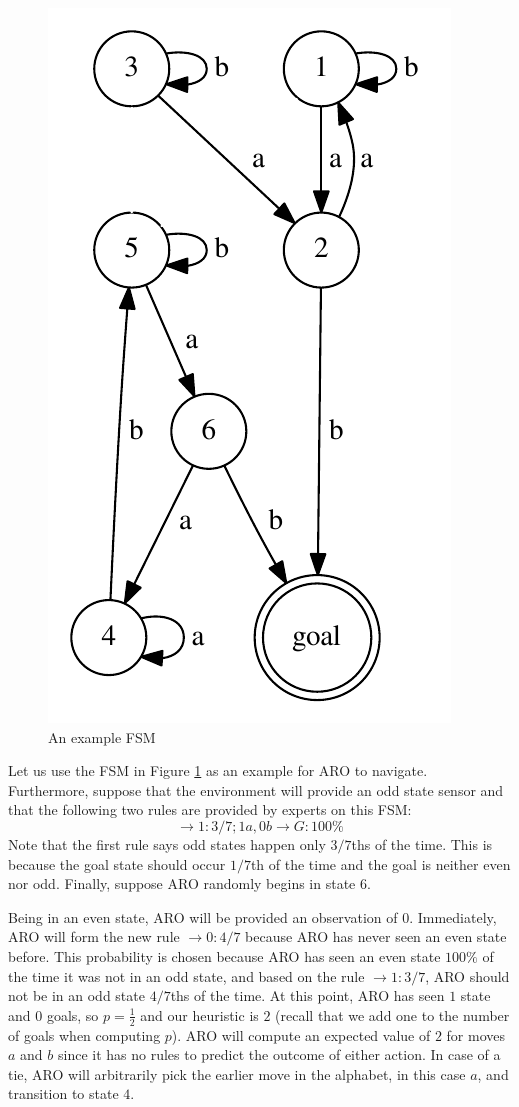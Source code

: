 \documentclass[letterpaper]{article} %
\begin{document}
\begin{figure}
	\centering
	\includegraphics[width=0.6\columnwidth]{ExampleFSM} %
	\caption{An example FSM}
	\label{fig1}
\end{figure}



Let us use the FSM in Figure \ref{fig1} as an example for ARO to navigate. Furthermore, suppose that the environment will provide an odd state sensor and that the following two rules are provided by experts on this FSM: $$ \rightarrow 1: 3/7; 1a, 0b \rightarrow G: 100\%$$
Note that the first rule says odd states happen only $3/7$ths of the time. This is because the goal state should occur $1/7$th of the time and the goal is neither even nor odd. Finally, suppose ARO randomly begins in state $6$.

Being in an even state, ARO will be provided an observation of $0$. Immediately, ARO will form the new rule $\rightarrow 0: 4/7$ because ARO has never seen an even state before. This probability is chosen because ARO has seen an even state $100\%$ of the time it was not in an odd state, and based on the rule $\rightarrow 1: 3/7$, ARO should not be in an odd state $4/7$ths of the time. At this point, ARO has seen $1$ state and $0$ goals, so $p = \frac{1}{2}$ and our heuristic is $2$ (recall that we add one to the number of goals when computing $p$). ARO will compute an expected value of $2$ for moves $a$ and $b$ since it has no rules to predict the outcome of either action. In case of a tie, ARO will arbitrarily pick the earlier move in the alphabet, in this case $a$, and transition to state $4$.
\end{document}
